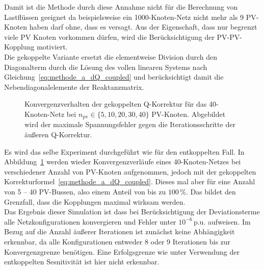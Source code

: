 Damit ist die Methode durch diese Annahme nicht für die Berechnung von Lastflüssen geeignet da beispielsweise ein 1000-Knoten-Netz nicht mehr als 9 PV-Knoten haben darf ohne, dass es versagt.
Aus der Eigenschaft, dass nur begrenzt viele PV Knoten vorkommen dürfen, wird die Berücksichtigung der PV-PV-Kopplung motiviert.\\


Die gekoppelte Variante ersetzt die elementweise Division durch den Diagonalterm durch die Lösung des vollen linearen Systems nach Gleichung~\eqref{eq:methode_a_dQ_coupled} und berücksichtigt damit die Nebendiagonalelemente der Reaktanzmatrix.

\begin{figure}[htbp]
	\centering
	
	\caption{Konvergenzverhalten der gekoppelten Q-Korrektur für das
		40-Knoten-Netz bei $n_\mathrm{pv} \in \{5, 10, 20, 30, 40\}$ PV-Knoten.
		Abgebildet wird der maximale Spannungsfehler gegen die Iterationsschritte der
		äußeren Q-Korrektur.}
	\label{fig:outer_convergence_error_coupled}
\end{figure}

Es wird das selbe Experiment durchgeführt wie für den entkoppelten Fall.
In Abbildung~\ref{fig:outer_convergence_error_coupled} werden wieder Konvergenzverläufe eines 40-Knoten-Netzes bei verschiedener Anzahl von PV-Knoten aufgenommen, jedoch mit der gekoppelten Korrekturformel~\eqref{eq:methode_a_dQ_coupled}. 
Dieses mal aber für eine Anzahl von 5 -- 40 PV-Bussen, also einem Anteil von bis zu $100\,\%$.
Das bildet den Grenzfall, dass die Kopplungen maximal wirksam werden.\\



Das Ergebnis dieser Simulation ist dass bei Berücksichtigung der Deviationsterme alle Netzkonfigurationen konvergieren und Fehler unter $10^{-6}\,\mathrm{p.u.}$ aufweisen.
Im Bezug auf die Anzahl äußerer Iterationen ist zunächst keine Abhängigkeit erkennbar, da alle Konfigurationen entweder 8 oder 9 Iterationen bis zur Konvergenzgrenze benötigen.
Eine Erfolgsgrenze wie unter Verwendung der entkoppelten Sesnitivität ist hier nicht erkennbar.\\

